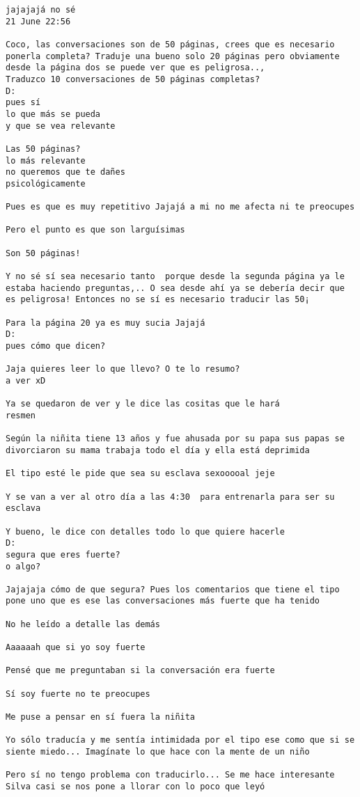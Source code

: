 \begin{verbatim}
jajajajá no sé
21 June 22:56

Coco, las conversaciones son de 50 páginas, crees que es necesario ponerla completa? Traduje una bueno solo 20 páginas pero obviamente desde la página dos se puede ver que es peligrosa..,
Traduzco 10 conversaciones de 50 páginas completas?
D:
pues sí
lo que más se pueda
y que se vea relevante

Las 50 páginas?
lo más relevante
no queremos que te dañes 
psicológicamente

Pues es que es muy repetitivo Jajajá a mi no me afecta ni te preocupes

Pero el punto es que son larguísimas

Son 50 páginas!

Y no sé sí sea necesario tanto  porque desde la segunda página ya le estaba haciendo preguntas,.. O sea desde ahí ya se debería decir que es peligrosa! Entonces no se sí es necesario traducir las 50¡

Para la página 20 ya es muy sucia Jajajá
D:
pues cómo que dicen?

Jaja quieres leer lo que llevo? O te lo resumo?
a ver xD

Ya se quedaron de ver y le dice las cositas que le hará
resmen

Según la niñita tiene 13 años y fue ahusada por su papa sus papas se divorciaron su mama trabaja todo el día y ella está deprimida

El tipo esté le pide que sea su esclava sexooooal jeje

Y se van a ver al otro día a las 4:30  para entrenarla para ser su esclava

Y bueno, le dice con detalles todo lo que quiere hacerle
D:
segura que eres fuerte?
o algo?

Jajajaja cómo de que segura? Pues los comentarios que tiene el tipo pone uno que es ese las conversaciones más fuerte que ha tenido

No he leído a detalle las demás

Aaaaaah que si yo soy fuerte

Pensé que me preguntaban si la conversación era fuerte

Sí soy fuerte no te preocupes

Me puse a pensar en sí fuera la niñita

Yo sólo traducía y me sentía intimidada por el tipo ese como que si se siente miedo... Imagínate lo que hace con la mente de un niño

Pero sí no tengo problema con traducirlo... Se me hace interesante
Silva casi se nos pone a llorar con lo poco que leyó


\end{verbatim}
